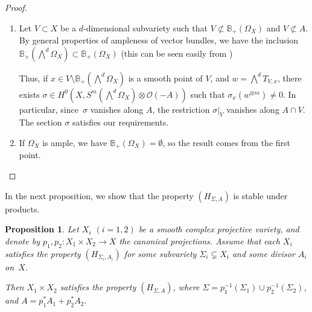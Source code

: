 \documentclass[JEP,XML,SOM,Unicode, NoEqCountersInSection,NoFloatCountersInSection,published]{cedram}
\let\mathcal\mathscr
\theoremstyle{theorem}
\newtheorem{proposition}{Proposition} [section]
\theoremstyle{definition}
\begin{document}
\skpt
\begin{proof}
\begin{enumerate}
\item
Let $V \subset X$ be a $d$-dimensional subvariety such that $V \not\subset \mathbb{B}_+(\Omega_X)$ and $V \not\subset A$. By general properties of ampleness of vector bundles, we have the inclusion $\mathbb{B}_+(\bigwedge^d \Omega_X) \subset \mathbb{B}_+(\Omega_X)$ (this can be seen easily \eg from \cite[Cor.\,6.1.16]{lazpos2})

Thus, if $x \in V \setminus \mathbb{B}_+(\bigwedge^d \Omega_X)$ is a smooth point of $V$, and $w = \bigwedge^d T_{V, x}$, there exists $\sigma \in H^0(X, S^m(\bigwedge^d \Omega_X) \otimes \mathcal O(-A))$ such that $\sigma_x(w^{\otimes m}) \neq 0$. In particular, since~$\sigma$ vanishes along $A$, the restriction $\sigma|_{V}$ vanishes along $A \cap V$. The section $\sigma$ satisfies our requirements.

\item
If $\Omega_X$ is ample, we have $\mathbb{B}_+(\Omega_X) = \emptyset$, so the result comes from the first point.\qedhere
\end{enumerate}
\end{proof}

In the next proposition, we show that the property $(H_{\Sigma, A})$ is stable under products.

\begin{proposition} \label{propstabproduct}
Let $X_i$ $(i = 1, 2)$ be a smooth complex projective variety, and denote by $p_1, p_2 : X_1 \times X_2 \to X$ the canonical projections. Assume that each $X_i$ satisfies the property $(H_{\Sigma_i, A_i})$ for some subvariety $\Sigma_i \!\subsetneq\! X_i$ and some divisor $A_i$ on~$X$.

Then $X_1 \times X_2$ satisfies the property $(H_{\Sigma, A})$, where $\Sigma = p_1^{-1}(\Sigma_1) \cup p_2^{-1}(\Sigma_2)$, and $A = p_1^\ast A_1 + p_2^\ast A_2$.
\end{proposition}
\end{document}
